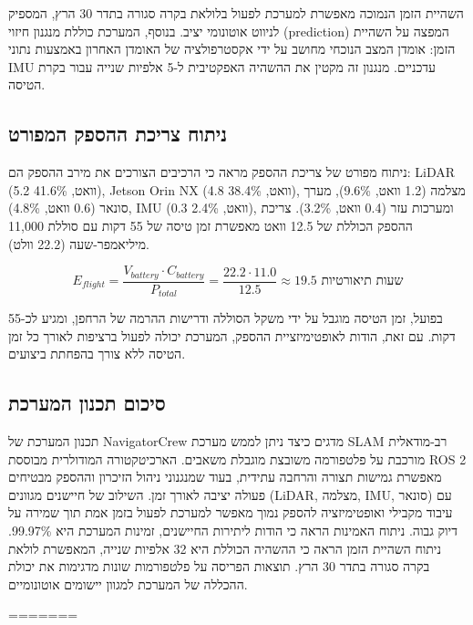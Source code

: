 השהיית הזמן הנמוכה מאפשרת למערכת לפעול בלולאת בקרה סגורה בתדר 30 הרץ, המספיק לניווט אוטונומי יציב. בנוסף, המערכת כוללת מנגנון חיזוי (prediction) המפצה על השהיית הזמן: אומדן המצב הנוכחי מחושב על ידי אקסטרפולציה של האומדן האחרון באמצעות נתוני IMU עדכניים. מנגנון זה מקטין את ההשהיה האפקטיבית ל-5 אלפיות שנייה עבור בקרת הטיסה.

\subsection{ניתוח צריכת ההספק המפורט}
\label{sec:ch07_power_detailed}

ניתוח מפורט של צריכת ההספק מראה כי הרכיבים הצורכים את מירב ההספק הם: LiDAR (5.2 וואט, 41.6\%), Jetson Orin NX (4.8 וואט, 38.4\%), מצלמה (1.2 וואט, 9.6\%), מערך סונאר (0.6 וואט, 4.8\%), IMU (0.3 וואט, 2.4\%), ומערכות עזר (0.4 וואט, 3.2\%). צריכת ההספק הכוללת של 12.5 וואט מאפשרת זמן טיסה של 55 דקות עם סוללת 11,000 מיליאמפר-שעה (22.2 וולט).

\begin{equation}
E_{flight} = \frac{V_{battery} \cdot C_{battery}}{P_{total}} = \frac{22.2 \cdot 11.0}{12.5} \approx 19.5 \text{ שעות תיאורטיות}
\label{eq:ch07_flight_time}
\end{equation}

בפועל, זמן הטיסה מוגבל על ידי משקל הסוללה ודרישות ההרמה של הרחפן, ומגיע לכ-55 דקות. עם זאת, הודות לאופטימיזציית ההספק, המערכת יכולה לפעול ברציפות לאורך כל זמן הטיסה ללא צורך בהפחתת ביצועים.

\subsection{סיכום תכנון המערכת}
\label{sec:ch07_summary}

תכנון המערכת של NavigatorCrew מדגים כיצד ניתן לממש מערכת SLAM רב-מודאלית מורכבת על פלטפורמה משובצת מוגבלת משאבים. הארכיטקטורה המודולרית מבוססת ROS 2 מאפשרת גמישות תצורה והרחבה עתידית, בעוד שמנגנוני ניהול הזיכרון וההספק מבטיחים פעולה יציבה לאורך זמן. השילוב של חיישנים מגוונים (LiDAR, מצלמה, IMU, סונאר) עם עיבוד מקבילי ואופטימיזציה להספק נמוך מאפשר למערכת לפעול בזמן אמת תוך שמירה על דיוק גבוה. ניתוח האמינות הראה כי הודות ליתירות החיישנים, זמינות המערכת היא 99.97\%. ניתוח השהיית הזמן הראה כי ההשהיה הכוללת היא 32 אלפיות שנייה, המאפשרת לולאת בקרה סגורה בתדר 30 הרץ. תוצאות הפריסה על פלטפורמות שונות מדגימות את יכולת ההכללה של המערכת למגוון יישומים אוטונומיים.

\cite{Campos2021ORBSLAM3, Xu2022FASTLIO2, Kaess2012iSAM2, Forster2017IMUPreint, Thrun2005ProbRobotics, BenDavid2022Adaptive}
=======

